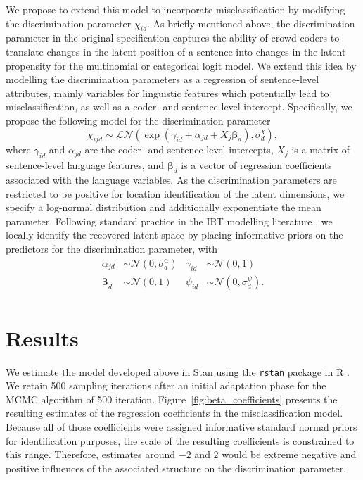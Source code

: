 \documentclass[a4paper, 12pt]{article}
\begin{document}
We propose to extend this model to incorporate misclassification by modifying the discrimination parameter $\chi_{id}$. As briefly mentioned above, the discrimination parameter in the original specification captures the ability of crowd coders to translate changes in the latent position of a sentence into changes in the latent propensity for the multinomial or categorical logit model. We extend this idea by modelling the discrimination parameters as a regression of sentence-level attributes, mainly variables for linguistic features which potentially lead to misclassification, as well as a coder- and sentence-level intercept. Specifically, we propose the following model for the discrimination parameter
\begin{equation*}
  \chi_{ijd} \sim \mathcal{LN}(\exp(\gamma_{id} + \alpha_{jd} + X_j \bm{\beta}_d), \sigma^\chi_d),
\end{equation*}
where $\gamma_{id}$ and $\alpha_{jd}$ are the coder- and sentence-level intercepts, $X_j$ is a matrix of sentence-level language features, and $\bm{\beta}_d$ is a vector of regression coefficients associated with the language variables. As the discrimination parameters are restricted to be positive for location identification of the latent dimensions, we specify a log-normal distribution and additionally exponentiate the mean parameter. Following standard practice in the IRT modelling literature \citep[e.g.][]{DBC+2014,Jackman2001}, we locally identify the recovered latent space by placing informative priors on the predictors for the discrimination parameter, with
\begin{align*}
    \alpha_{jd} & \sim \mathcal{N}(0, \sigma^{\alpha}_{d}) &
    \gamma_{id} & \sim \mathcal{N}(0, 1) \\
    \bm{\beta}_{d} & \sim \mathcal{N}(0, 1) &
    \psi_{id} & \sim  \mathcal{N}(0, \sigma^{\psi}_{d}) . \\
\end{align*}

\section{Results}
\label{sec:results}

We estimate the model developed above in Stan \citep{CGH+2016} using the \texttt{rstan} package \citep{RStan2018} in R \citep{R2017}. We retain 500 sampling iterations after an initial adaptation phase for the MCMC algorithm of 500 iteration. Figure~\ref{fig:beta_coefficients} presents the resulting estimates of the regression coefficients in the misclassification model. Because all of those coefficients were assigned informative standard normal priors for identification purposes, the scale of the resulting coefficients is constrained to this range. Therefore, estimates around $-2$ and $2$ would be extreme negative and positive influences of the associated structure on the discrimination parameter.
\end{document}
